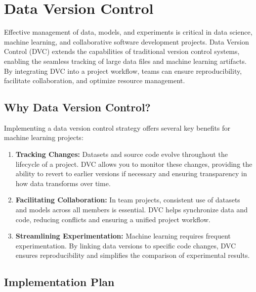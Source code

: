 %
%

\chapter{Data Version Control}

Effective management of data, models, and experiments is critical in data science, machine learning, and collaborative software development projects. Data Version Control (DVC) extends the capabilities of traditional version control systems, enabling the seamless tracking of large data files and machine learning artifacts. By integrating DVC into a project workflow, teams can ensure reproducibility, facilitate collaboration, and optimize resource management.

\section{Why Data Version Control?}

Implementing a data version control strategy offers several key benefits for machine learning projects:

\begin{enumerate}
	\item \textbf{Tracking Changes:} Datasets and source code evolve throughout the lifecycle of a project. DVC allows you to monitor these changes, providing the ability to revert to earlier versions if necessary and ensuring transparency in how data transforms over time.
	\item \textbf{Facilitating Collaboration:} In team projects, consistent use of datasets and models across all members is essential. DVC helps synchronize data and code, reducing conflicts and ensuring a unified project workflow.
	\item \textbf{Streamlining Experimentation:} Machine learning requires frequent experimentation. By linking data versions to specific code changes, DVC ensures reproducibility and simplifies the comparison of experimental results.
\end{enumerate}

\section{Implementation Plan}

